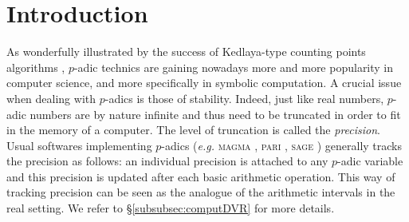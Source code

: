 \documentclass{article}
\begin{document}
\section{Introduction}

As wonderfully illustrated by the success of Kedlaya-type counting 
points algorithms \cite{kedlaya}, $p$-adic technics are gaining nowadays 
more and more popularity in computer science, and more specifically in 
symbolic computation. A crucial issue when dealing with $p$-adics is 
those of stability. Indeed, just like real numbers, $p$-adic numbers are 
by nature infinite and thus need to be truncated in order to fit in the 
memory of a computer. The level of truncation is called the 
\emph{precision}. Usual softwares implementing $p$-adics (\emph{e.g.} 
\textsc{magma} \cite{magma}, \textsc{pari} \cite{pari}, \textsc{sage} 
\cite{sage}) generally tracks the precision as follows: an individual 
precision is attached to any $p$-adic variable and this precision is 
updated after each basic arithmetic operation. This way of tracking 
precision can be seen as the analogue of the arithmetic intervals in the 
real setting. We refer to \S \ref{subsubsec:computDVR} for more details.
\end{document}
